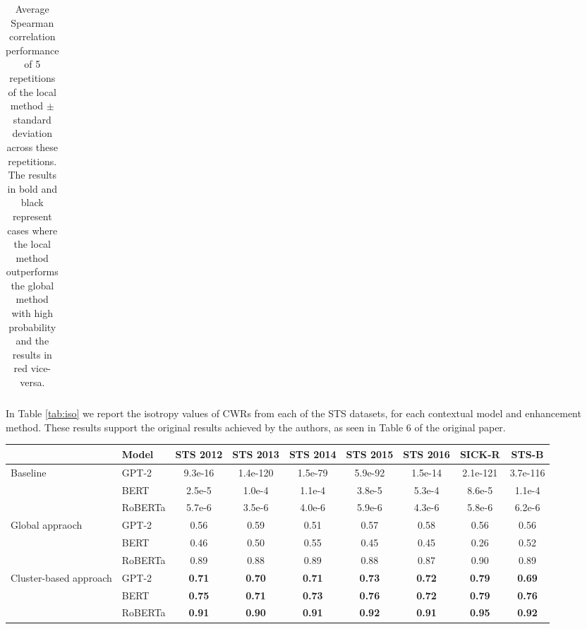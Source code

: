 \begin{table}[h]
\begin{tabular}{cccccccc}
\hline
\end{tabular}
\caption{Average Spearman correlation performance of 5 repetitions of the local method $\pm$ standard deviation across these repetitions. The results in bold and black represent cases where the local method outperforms the global method with high probability and the results in red vice-versa. }
\label{tab:avgs}
\end{table}


In Table \ref{tab:iso} we report the isotropy values of CWRs from each of the STS datasets, for each contextual model and enhancement method. These results support the original results achieved by the authors, as seen in Table 6 of the original paper.

\setlength{\tabcolsep}{1.5pt}
\begin{table*}[h]
\centering
\begin{tabular}{llccccccc} 
\hline
                                        & Model        & STS 2012       & STS 2013       & STS 2014       & STS 2015       & STS 2016       & SICK-R         & STS-B           \\ 
\hline
\multirow{3}{*}{Baseline}               & GPT-2   & 9.3e-16   &   1.4e-120  &   1.5e-79   &    5.9e-92   &    1.5e-14 &   2.1e-121 &  3.7e-116           \\
                                        & BERT    & 2.5e-5   &   1.0e-4  &   1.1e-4   &    3.8e-5   &    5.3e-4 &   8.6e-5 &  1.1e-4           \\
                                        & RoBERTa & 5.7e-6   &   3.5e-6  &   4.0e-6   &    5.9e-6   &    4.3e-6 &   5.8e-6 &  6.2e-6           \\ 
\hline
\multirow{3}{2cm}{Global appraoch}        & GPT-2   & 0.56   &   0.59  &   0.51   &    0.57   &    0.58 &   0.56 &  0.56           \\
                                        & BERT    & 0.46   &   0.50  &   0.55   &    0.45   &    0.45 &   0.26 &  0.52           \\
                                        & RoBERTa & 0.89   &   0.88  &   0.89   &    0.88   &    0.87 &   0.90 &  0.89           \\ 
\hline
\multirow{3}{2cm}{Cluster-based approach} & GPT-2   & {\bfseries 0.71}   &   \textbf{0.70}  &   \textbf{0.71}   &    \textbf{0.73}   &    \textbf{0.72} &   \textbf{0.79} &  \textbf{0.69}  \\
                                        & BERT    & \textbf{0.75}   &   \textbf{0.71}  &   \textbf{0.73}   &    \textbf{0.76}   &    \textbf{0.72} &   \textbf{0.79} &  \textbf{0.76}  \\
                                        & RoBERTa & \textbf{0.91}   &   \textbf{0.90}  &   \textbf{0.91}   &    \textbf{0.92}   &    \textbf{0.91} &   \textbf{0.95} &  \textbf{0.92}  \\
\hline
\end{tabular}
\caption{Isotropy of contextual word embeddings before and after enhancement with the global and local method.}
\label{tab:iso}
\end{table*}

